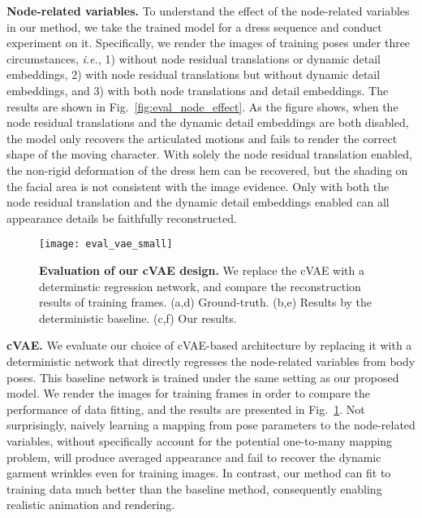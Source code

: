 \noindent\textbf{Node-related variables.} 
To understand the effect of the node-related variables in our method, we take the trained model for a dress sequence and conduct experiment on it. Specifically, we render the images of training poses under three circumstances, \textit{i.e.}, 1) without node residual translations or dynamic detail embeddings, 2) with node residual translations but without dynamic detail embeddings, and 3) with both node translations and detail embeddings. 
The results are shown in Fig.~\ref{fig:eval_node_effect}. 
As the figure shows, when the node residual translations and the dynamic detail embeddings are both disabled, the model only recovers the articulated motions and fails to render the correct shape of the moving character. With solely the node residual translation enabled, the non-rigid deformation of the dress hem can be recovered, but the shading on the facial area is not consistent with the image evidence. Only with both the node residual translation and the dynamic detail embeddings enabled can all appearance details be faithfully reconstructed. 



\begin{figure}
    \centering
    \texttt{[image: eval\_vae\_small]}
    \caption{\textbf{Evaluation of our cVAE design.} We replace the cVAE with a determinstic regression network, and compare the reconstruction results of training frames. (a,d) Ground-truth. (b,e) Results by the deterministic baseline. (c,f) Our results.  }
    \label{fig:eval_cvae}
\end{figure}


\noindent\textbf{cVAE. }
We evaluate our choice of cVAE-based architecture by replacing it with a deterministic network that directly regresses the node-related variables from body poses. This baseline network is trained under the same setting as our proposed model. 
We render the images for training frames in order to compare the performance of data fitting, and the results are  presented in Fig.~\ref{fig:eval_cvae}. 
Not surprisingly, naively learning a mapping from pose parameters to the node-related variables, without specifically account for the potential one-to-many mapping problem, will produce averaged appearance and fail to recover the dynamic garment wrinkles even for training images. In contrast, our method can fit to training data much better than the baseline method, consequently enabling realistic animation and rendering. 


